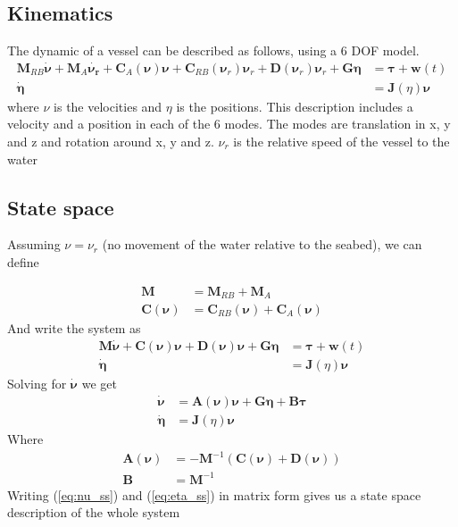 \documentclass[12pt,a4]{article}
\begin{document}
\subsection{Kinematics}
The dynamic of a vessel can be described as follows, using a 6 DOF model.
\begin{align}
	\bm{M}_{RB}\bm{\dot{\nu}} + \bm{M}_{A}\bm{\dot{\nu_r}} + \bm{C}_{A}(\bm{\nu})\bm{\nu} + \bm{C}_{RB}(\bm{\nu}_r)\bm{\nu}_r
	+ \bm{D}(\bm{\nu}_r)\bm{\nu}_r +\bm{G}\bm{\eta} & = \bm{\tau} + \bm{w}(t) \\
	\bm{\dot{\eta}}                                 & = \bm{J}(\eta)\bm{\nu}
\end{align}
where $\nu$ is the velocities and $\eta$ is the positions. This description includes a velocity and a position in each of the 6 modes.
The modes are translation in x, y and z and rotation around x, y and z. $\nu_r$ is the relative speed of the vessel to the water

\subsection{State space}
Assuming $\nu = \nu_r$ (no movement of the water relative to the seabed), we can define

\begin{align}
	\bm{M}           & = \bm{M}_{RB} + \bm{M}_{A}                     \\
	\bm{C}(\bm{\nu}) & = \bm{C}_{RB}(\bm{\nu}) + \bm{C}_{A}(\bm{\nu})
\end{align}
And write the system as
\begin{align}
	\bm{M}\bm{\dot{\nu}} + \bm{C}(\bm{\nu})\bm{\nu} + \bm{D}(\bm{\nu})\bm{\nu} +\bm{G}\bm{\eta} & = \bm{\tau} + \bm{w}(t) \\
	\bm{\dot{\eta}}                                                                             & = \bm{J}(\eta)\bm{\nu}
\end{align}
Solving for $\bm{\dot{\nu}}$ we get
\begin{align}
	\bm{\dot{\nu}}  & =	\bm{A}(\bm{\nu})\bm{\nu}+\bm{G}\bm{\eta}+\bm{B}\bm{\tau} 		\label{eq:nu_ss} \\
	\bm{\dot{\eta}} & =	\bm{J}(\eta)\bm{\nu}								\label{eq:eta_ss}
\end{align}
Where
\begin{align}
	\bm{A}(\bm{\nu}) & = -\bm{M}^{-1}(\bm{C}(\bm{\nu})+\bm{D}(\bm{\nu})) \\
	\bm{B}           & = \bm{M}^{-1}
\end{align}
Writing (\ref{eq:nu_ss}) and (\ref{eq:eta_ss}) in matrix form gives us a state space description of the whole system
\end{document}
